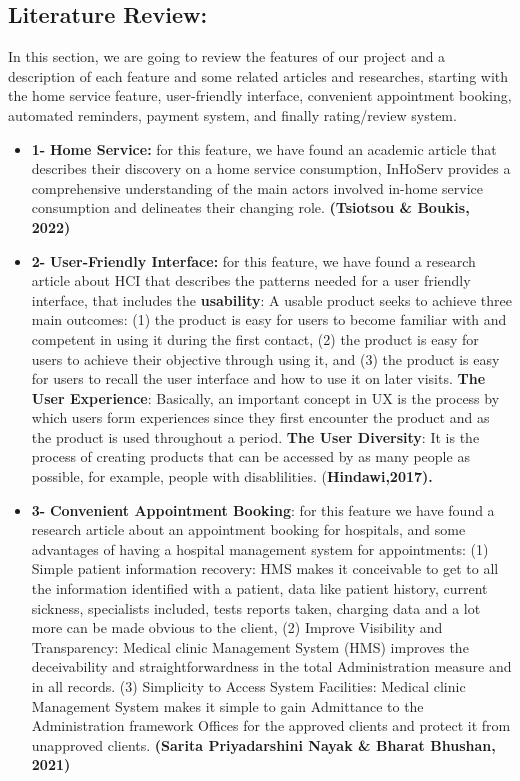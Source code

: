 \documentclass{article}
\begin{document}
      \subsection{Literature Review:}In this section, we are going to review the features of our project and a description of each feature and some related articles and researches, starting with the home service feature, user-friendly interface, convenient appointment booking, automated reminders, payment system, and finally rating/review system.
      \begin{itemize}
        \item \textbf{1- }\textbf{Home Service: }for this feature, we have found an academic article that describes their discovery on a home service consumption, InHoServ provides a comprehensive understanding of the main actors involved in-home service consumption and delineates their changing role. \textbf{(Tsiotsou \& Boukis, 2022)}
        \item \textbf{2- }\textbf{User-Friendly Interface: }for this feature, we have found a research article about HCI that describes the patterns needed for a user friendly interface, that includes the \textbf{usability}: A usable product seeks to achieve three main outcomes: (1) the product is easy for users to become familiar with and competent in using it during the first contact, (2) the product is easy for users to achieve their objective through using it, and (3) the product is easy for users to recall the user interface and how to use it on later visits. \textbf{The User Experience}: Basically, an important concept in UX is the process by which users form experiences since they first encounter the product and as the product is used throughout a period. \textbf{The User Diversity}: It is the process of creating products that can be accessed by as many people as possible, for example, people with disablilities. (\textbf{Hindawi,2017).}
        \item \textbf{3- }\textbf{Convenient Appointment Booking}: for this feature we have found a research article about an appointment booking for hospitals, and some advantages of having a hospital management system for appointments: (1) Simple patient information recovery: HMS makes it conceivable to get to all the information identified with a patient, data like patient history, current sickness, specialists included, tests reports taken, charging data and a lot more can be made obvious to the client, (2) Improve Visibility and Transparency: Medical clinic Management System (HMS) improves the deceivability and straightforwardness in the total Administration measure and in all records. (3) Simplicity to Access System Facilities: Medical clinic Management System makes it simple to gain Admittance to the Administration framework Offices for the approved clients and protect it from unapproved clients. \textbf{(Sarita Priyadarshini Nayak \& Bharat Bhushan, 2021)}

\end{itemize}
\end{document}
